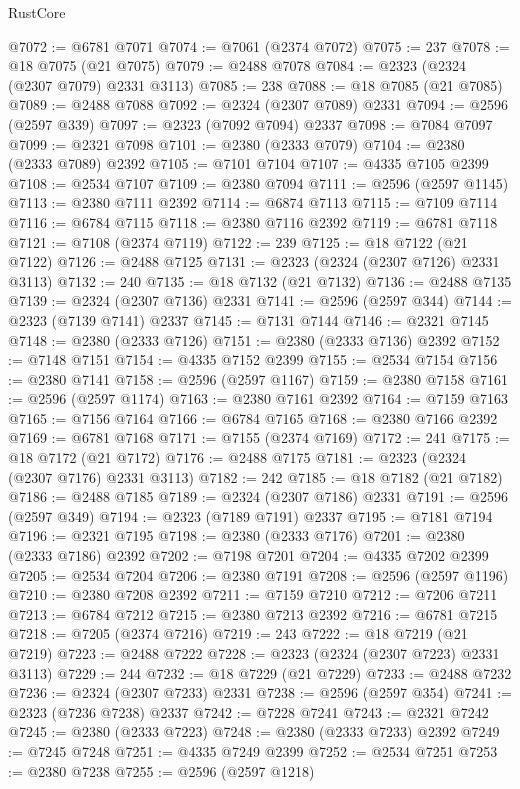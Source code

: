 \begin{lexlean}{RustCore}
\begin{coremodule}
@7072 := @6781 @7071
@7074 := @7061 (@2374 @7072)
@7075 := 237
@7078 := @18 @7075 (@21 @7075)
@7079 := @2488 @7078
@7084 := @2323 (@2324 (@2307 @7079) @2331 @3113)
@7085 := 238
@7088 := @18 @7085 (@21 @7085)
@7089 := @2488 @7088
@7092 := @2324 (@2307 @7089) @2331
@7094 := @2596 (@2597 @339)
@7097 := @2323 (@7092 @7094) @2337
@7098 := @7084 @7097
@7099 := @2321 @7098
@7101 := @2380 (@2333 @7079)
@7104 := @2380 (@2333 @7089) @2392
@7105 := @7101 @7104
@7107 := @4335 @7105 @2399
@7108 := @2534 @7107
@7109 := @2380 @7094
@7111 := @2596 (@2597 @1145)
@7113 := @2380 @7111 @2392
@7114 := @6874 @7113
@7115 := @7109 @7114
@7116 := @6784 @7115
@7118 := @2380 @7116 @2392
@7119 := @6781 @7118
@7121 := @7108 (@2374 @7119)
@7122 := 239
@7125 := @18 @7122 (@21 @7122)
@7126 := @2488 @7125
@7131 := @2323 (@2324 (@2307 @7126) @2331 @3113)
@7132 := 240
@7135 := @18 @7132 (@21 @7132)
@7136 := @2488 @7135
@7139 := @2324 (@2307 @7136) @2331
@7141 := @2596 (@2597 @344)
@7144 := @2323 (@7139 @7141) @2337
@7145 := @7131 @7144
@7146 := @2321 @7145
@7148 := @2380 (@2333 @7126)
@7151 := @2380 (@2333 @7136) @2392
@7152 := @7148 @7151
@7154 := @4335 @7152 @2399
@7155 := @2534 @7154
@7156 := @2380 @7141
@7158 := @2596 (@2597 @1167)
@7159 := @2380 @7158
@7161 := @2596 (@2597 @1174)
@7163 := @2380 @7161 @2392
@7164 := @7159 @7163
@7165 := @7156 @7164
@7166 := @6784 @7165
@7168 := @2380 @7166 @2392
@7169 := @6781 @7168
@7171 := @7155 (@2374 @7169)
@7172 := 241
@7175 := @18 @7172 (@21 @7172)
@7176 := @2488 @7175
@7181 := @2323 (@2324 (@2307 @7176) @2331 @3113)
@7182 := 242
@7185 := @18 @7182 (@21 @7182)
@7186 := @2488 @7185
@7189 := @2324 (@2307 @7186) @2331
@7191 := @2596 (@2597 @349)
@7194 := @2323 (@7189 @7191) @2337
@7195 := @7181 @7194
@7196 := @2321 @7195
@7198 := @2380 (@2333 @7176)
@7201 := @2380 (@2333 @7186) @2392
@7202 := @7198 @7201
@7204 := @4335 @7202 @2399
@7205 := @2534 @7204
@7206 := @2380 @7191
@7208 := @2596 (@2597 @1196)
@7210 := @2380 @7208 @2392
@7211 := @7159 @7210
@7212 := @7206 @7211
@7213 := @6784 @7212
@7215 := @2380 @7213 @2392
@7216 := @6781 @7215
@7218 := @7205 (@2374 @7216)
@7219 := 243
@7222 := @18 @7219 (@21 @7219)
@7223 := @2488 @7222
@7228 := @2323 (@2324 (@2307 @7223) @2331 @3113)
@7229 := 244
@7232 := @18 @7229 (@21 @7229)
@7233 := @2488 @7232
@7236 := @2324 (@2307 @7233) @2331
@7238 := @2596 (@2597 @354)
@7241 := @2323 (@7236 @7238) @2337
@7242 := @7228 @7241
@7243 := @2321 @7242
@7245 := @2380 (@2333 @7223)
@7248 := @2380 (@2333 @7233) @2392
@7249 := @7245 @7248
@7251 := @4335 @7249 @2399
@7252 := @2534 @7251
@7253 := @2380 @7238
@7255 := @2596 (@2597 @1218)

\end{coremodule}
\end{lexlean}
